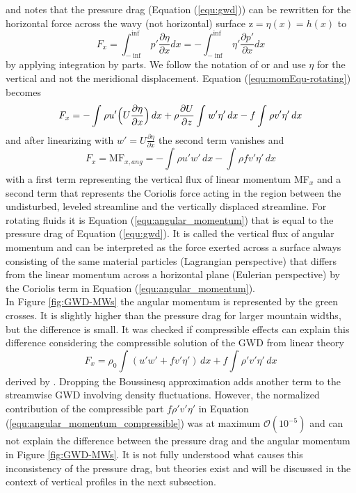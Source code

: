 and notes that the pressure drag (Equation (\ref{equ:gwd})) can be rewritten for the horizontal force across the wavy (not horizontal) surface z$= \eta(x)=h(x)$ to
\begin{equation}
    F_x =  \int_{-\inf}^{\inf} p' \frac{\partial \eta}{\partial x} dx = -\int_{-\inf}^{\inf} \eta' \frac{\partial p'}{\partial x} dx
    \label{equ:pdrag-rotating}
\end{equation}
by applying integration by parts. We follow the notation of \textcite[]{smith_influence_1979} or \textcite{broad_linear_1995} and use $\eta$ for the vertical and not the meridional displacement. Equation (\ref{equ:momEqu-rotating}) becomes 
\begin{equation}
    F_x =  -\int_{}^{} \rho u' \Bigl(U \frac{\partial \eta}{\partial x}\Bigr) \, dx + \rho \frac{\partial U}{\partial z} \int_{}^{} w' \eta' \, dx  - f \int_{}^{} \rho v' \eta' \, dx 
    \label{equ:momEqu-rotating-2}
\end{equation}
and after linearizing with $w'=U\frac{\partial \eta}{\partial x}$ the second term vanishes and
\begin{equation}
    F_x = \mathrm{MF}_{x,ang} = -\int_{}^{} \rho u'w' \, dx  -  \int_{}^{} \rho f v' \eta' \, dx
    \label{equ:angular_momentum}
\end{equation}
with a first term representing the vertical flux of linear momentum MF$_x$ and a second term that represents the Coriolis force acting in the region between the undisturbed, leveled streamline and the vertically displaced streamline. For rotating fluids it is Equation (\ref{equ:angular_momentum}) that is equal to the pressure drag of Equation (\ref{equ:gwd}). It is called the vertical flux of angular momentum and can be interpreted as the force exerted across a surface always consisting of the same material particles (Lagrangian perspective) that differs from the linear momentum across a horizontal plane (Eulerian perspective) by the Coriolis term in Equation (\ref{equ:angular_momentum}). \\
In Figure \ref{fig:GWD-MWs} the angular momentum is represented by the green crosses. It is slightly higher than the pressure drag for larger mountain widths, but the difference is small. It was checked if compressible effects can explain this difference considering the compressible solution of the GWD from linear theory 
\begin{equation}
    F_x =  \rho_0 \int_{}^{} (u'w' + f v' \eta') \, dx + f \int_{}^{} \rho' v' \eta' \, dx
    \label{equ:angular_momentum_compressible}
\end{equation}
derived by \textcite[]{broad_linear_1995}. Dropping the Boussinesq approximation adds another term to the streamwise GWD involving density fluctuations. However, the normalized contribution of the compressible part $f \rho' v' \eta'$ in Equation (\ref{equ:angular_momentum_compressible}) was at maximum $\mathcal{O}(10^{-5})$ and can not explain the difference between the pressure drag and the angular momentum in Figure \ref{fig:GWD-MWs}. It is not fully understood what causes this inconsistency of the pressure drag, but theories exist and will be discussed in the context of vertical profiles in the next subsection. 

